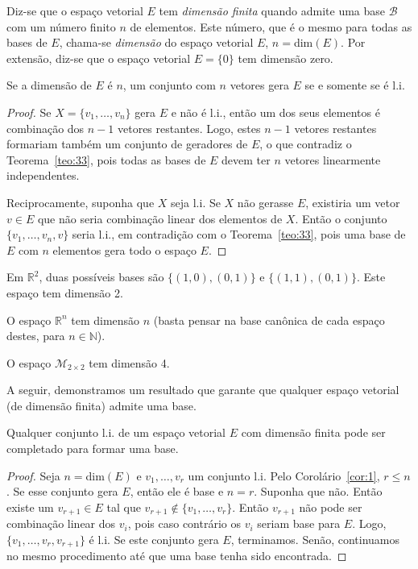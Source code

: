 \begin{defi}
  Diz-se que o espaço vetorial $E$ tem \emph{dimensão finita} quando admite uma base ${\mathcal{B}}$ com um número finito $n$ de elementos. Este número, que é o mesmo para todas as bases de $E$, chama-se \emph{dimensão} do espaço vetorial $E$, $n=$dim$(E)$. Por extensão, diz-se que o espaço vetorial $E=\{0\}$ tem dimensão zero.   
\end{defi}

\begin{coro}
  Se a dimensão de $E$ é $n$, um conjunto com $n$ vetores gera $E$ se e somente se é l.i.
\end{coro}
\begin{proof}
Se $X=\{v_1,\ldots,v_n\}$ gera $E$ e não é l.i., então um dos seus elementos é combinação dos $n-1$ vetores restantes. Logo, estes $n-1$ vetores restantes formariam também um conjunto de geradores de $E$, o que contradiz o Teorema~\ref{teo:33}, pois todas as bases de $E$ devem ter $n$ vetores linearmente independentes. 

Reciprocamente, suponha que $X$ seja l.i. Se $X$ não gerasse $E$, existiria um vetor $v\in E$ que não seria combinação linear dos elementos de $X$. Então o conjunto $\{ v_1,\ldots,v_n,v\}$ seria l.i., em contradição com o Teorema~\ref{teo:33}, pois uma base de $E$ com $n$ elementos gera todo o espaço $E$.
\end{proof}

\begin{exemplo}
	Em ${\mathbb{R}}^2$, duas possíveis bases são $\{ (1,0), (0,1)\}$ e $\{(1,1),(0,1)\}$. Este espaço tem dimensão 2.
\end{exemplo}

\begin{exemplo}
	O espaço ${\mathbb{R}}^n$ tem dimensão $n$ (basta pensar na base canônica de cada espaço destes, para $n\in {\mathbb{N}}$).
\end{exemplo}

\begin{exemplo}
	O espaço ${\mathcal{M}}_{2\times 2}$ tem dimensão 4.
\end{exemplo}

A seguir, demonstramos um resultado que garante que qualquer espaço vetorial (de dimensão finita) admite uma base.

\begin{teo}
  Qualquer conjunto l.i. de um espaço vetorial $E$ com dimensão finita pode ser completado para formar uma base.
\end{teo}
\begin{proof}
Seja $n = $dim$(E)$ e $v_1,\ldots, v_r$ um conjunto l.i. Pelo Corolário~\ref{cor:1}, $r\leq n$. Se esse conjunto gera $E$, então ele é base e $n=r$. Suponha que não. Então existe um $v_{r+1} \in E$ tal que $v_{r+1}\not\in \{v_1,\ldots,v_r\}$. Então $v_{r+1}$ não pode ser combinação linear dos $v_i$, pois caso contrário os $v_i$ seriam base para $E$. Logo, $\{v_1,\ldots,v_r,v_{r+1}\}$ é l.i. Se este conjunto gera $E$, terminamos. Senão, continuamos no mesmo procedimento até que uma base tenha sido encontrada.
\end{proof}

